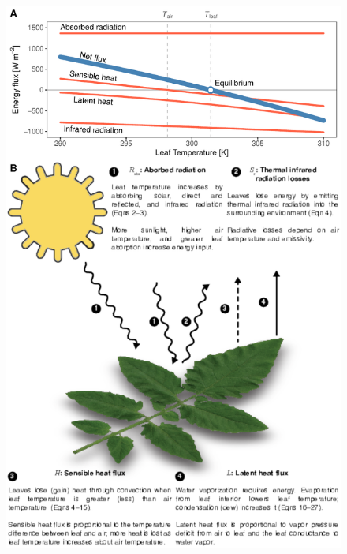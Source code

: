 \documentclass[11pt, oneside]{article}
\begin{document}
\clearpage


\begin{figure}[ht]
\centerline{\includegraphics[height=\textheight,keepaspectratio]{../figures/fig1.pdf}}
\end{figure}
\end{document}
